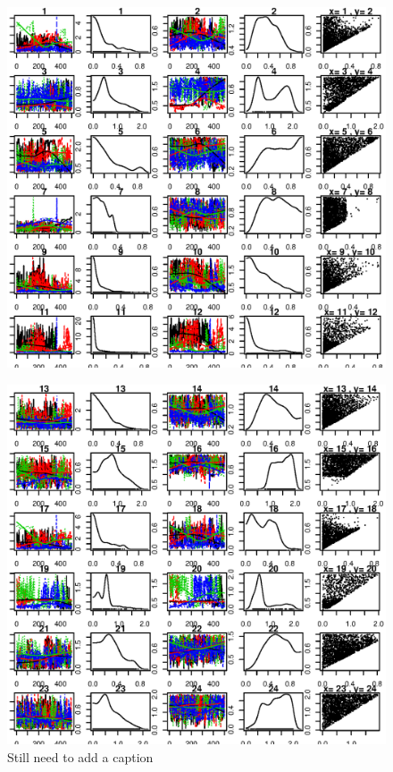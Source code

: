 \documentclass[paper=a4, fontsize=11pt]{scrartcl}
\numberwithin{equation}{section}		%
\numberwithin{figure}{section}			%
\numberwithin{table}{section}				%
\begin{document}
\begin{figure}[ht]
\centerline{\includegraphics[]{distr-par1-12.eps}}
\caption{} 
\label{}
\end{figure}
\begin{figure}[ht]
\centerline{\includegraphics[]{distr-par13-24.eps}}
\caption{Still need to add a caption} 
\label{fig: parameter summary}
\end{figure}



\end{document}
